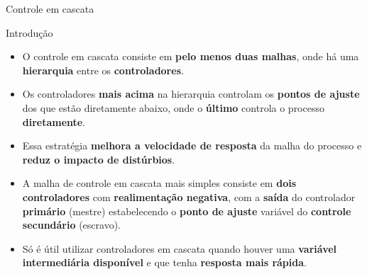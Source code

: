 \begin{frame}{Controle em cascata}
	\begin{block}{Introdução}
		\begin{itemize}
			\item O controle em cascata consiste em \textbf{pelo menos duas malhas}, onde há uma \textbf{hierarquia} entre os \textbf{controladores}.
			\item Os controladores \textbf{mais acima} na hierarquia controlam os \textbf{pontos de ajuste} dos que estão diretamente abaixo, onde o \textbf{último} controla o processo \textbf{diretamente}.
			\item Essa estratégia \textbf{melhora a velocidade de resposta} da malha do processo e \textbf{reduz o impacto de distúrbios}.
			\item A malha de controle em cascata mais simples consiste em \textbf{dois controladores} com \textbf{realimentação negativa}, com a \textbf{saída} do controlador \textbf{primário} (mestre) estabelecendo o \textbf{ponto de ajuste} variável do \textbf{controle secundário} (escravo).
			\item Só é útil utilizar controladores em cascata quando houver uma \textbf{variável intermediária disponível} e que tenha \textbf{resposta mais rápida}.
		\end{itemize}
	\end{block}
\end{frame}


